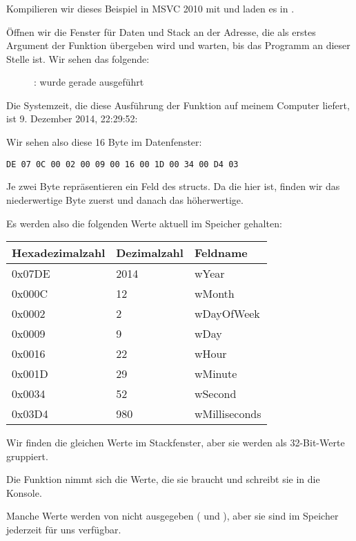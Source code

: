 \clearpage
\subsubsection{\olly}
\myindex{\olly}
Kompilieren wir dieses Beispiel in MSVC 2010 mit  und laden es in \olly.

Öffnen wir die Fenster für Daten und Stack an der Adresse, die als erstes Argument der Funktion 
übergeben wird und warten, bis das Programm an dieser Stelle ist. Wir sehen das folgende:

\begin{figure}[H]
\centering
{}
\caption{\olly:  wurde gerade ausgeführt}
\label{fig:struct_olly_1}
\end{figure}
Die Systemzeit, die diese Ausführung der Funktion auf meinem Computer liefert, ist 9. Dezember 2014, 22:29:52:


Wir sehen also diese 16 Byte im Datenfenster:
 
\begin{lstlisting}
DE 07 0C 00 02 00 09 00 16 00 1D 00 34 00 D4 03
\end{lstlisting}
Je zwei Byte repräsentieren ein Feld des structs. 
Da die  hier  ist, finden wir das niederwertige Byte zuerst und danach das
höherwertige.

Es werden also die folgenden Werte aktuell im Speicher gehalten:

\begin{center}
\begin{tabular}{ | l | l | l | }
\hline
\headercolor{} Hexadezimalzahl & 
\headercolor{} Dezimalzahl & 
\headercolor{} Feldname \\
\hline
0x07DE & 2014	& wYear \\
\hline
0x000C & 12	& wMonth \\
\hline
0x0002 & 2	& wDayOfWeek \\
\hline
0x0009 & 9	& wDay \\
\hline
0x0016 & 22	& wHour \\
\hline
0x001D & 29	& wMinute \\
\hline
0x0034 & 52	& wSecond \\
\hline	
0x03D4 & 980	& wMilliseconds \\
\hline
\end{tabular}
\end{center}
Wir finden die gleichen Werte im Stackfenster, aber sie werden als 32-Bit-Werte gruppiert.

Die Funktion \printf nimmt sich die Werte, die sie braucht und schreibt sie in die Konsole.

Manche Werte werden von \printf nicht ausgegeben ( und ), aber sie sind im Speicher
jederzeit für uns verfügbar.
